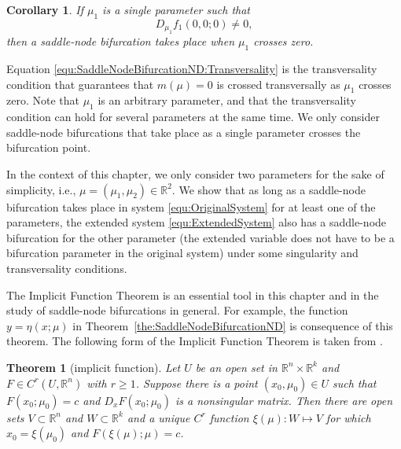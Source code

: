 \documentclass[12pt]{article}
\newtheorem{theorem}{Theorem}
\newtheorem{corollary}{Corollary}
\begin{document}
\begin{corollary}
    \label{the:SaddleNodeBifurcationNDCorollary}
    If $\mu_1$ is a single parameter such that 
    \begin{equation}
        D_{\mu_1}f_1(0,0;0)\neq 0,
        \label{equ:SaddleNodeBifurcationND:Transversality}
    \end{equation}
    then a saddle-node bifurcation takes place when $\mu_1$ crosses zero.
\end{corollary}

Equation \eqref{equ:SaddleNodeBifurcationND:Transversality} is the transversality condition that guarantees that $m(\mu)=0$ is crossed transversally as $\mu_{1}$ crosses zero. Note that $\mu_{1}$ is an arbitrary parameter, and that the transversality condition can hold for several parameters at the same time. We only consider saddle-node bifurcations that take place as a single parameter crosses the bifurcation point.

In the context of this chapter, we only consider two parameters for the sake of simplicity, i.e., $\mu=(\mu_{1},\mu_{2})\in\mathbb{R}^{2}$. We show that as long as a saddle-node bifurcation takes place in system \eqref{equ:OriginalSystem} for at least one of the parameters, the extended system \eqref{equ:ExtendedSystem} also has a saddle-node bifurcation for the other parameter (the extended variable does not have to be a bifurcation parameter in the original system) under some singularity and transversality conditions.

The Implicit Function Theorem is an essential tool in this chapter and in the study of saddle-node bifurcations in general. For example, the function $y=\eta(x;\mu)$ in Theorem~\ref{the:SaddleNodeBifurcationND} is consequence of this theorem. The following form of the Implicit Function Theorem is taken from \citet[Ch. 8]{Meiss2007}.
\begin{theorem}[implicit function]
    \label{the:ImplicitFunction}
    Let $U$ be an open set in $\mathbb{R}^{n}\times\mathbb{R}^{k}$ and $F\in C^{r}(U,\mathbb{R}^{n})$ with $r\geq 1$. Suppose there is a point $(x_{0},\mu_{0})\in U$ such that $F(x_{0};\mu_{0})=c$ and $D_{x}F(x_{0};\mu_{0})$ is a nonsingular matrix. Then there are open sets $V\subset \mathbb{R}^{n}$ and $W\subset \mathbb{R}^{k}$ and a unique $C^{r}$ function $\xi(\mu):W\mapsto V$ for which $x_{0}=\xi(\mu_{0})$ and $F(\xi(\mu);\mu)=c$.
\end{theorem}
\end{document}

